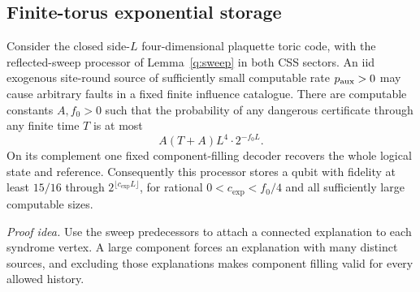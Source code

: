 \subsection{Finite-torus exponential storage}\label{q:closed-exponential}
\begin{lemma}\label{x:exponential}
Consider the closed side-\(L\) four-dimensional plaquette toric code,
with the reflected-sweep processor of Lemma~\ref{q:sweep} in both
CSS sectors. An iid exogenous site-round source of sufficiently small
computable rate \(p_{\rm aux}>0\) may cause arbitrary faults in a
fixed finite influence catalogue. There are computable constants
\(A,f_0>0\) such that the probability of any dangerous
certificate through any finite time \(T\) is at most
\begin{equation}\label{x:exp-bound}
 A(T+A)L^4\cdot2^{-f_0L}.
\end{equation}
On its complement one fixed component-filling decoder recovers the
whole logical state and reference. Consequently this processor stores
a qubit with fidelity at least \(15/16\) through
\(2^{\lfloor c_{\exp}L\rfloor}\), for rational
\(0<c_{\exp}<f_0/4\) and all sufficiently large computable sizes.
\end{lemma}
\par\noindent\emph{Proof idea.} Use the sweep predecessors to attach a connected explanation to each syndrome vertex. A large component forces an explanation with many distinct sources, and excluding those explanations makes component filling valid for every allowed history.

